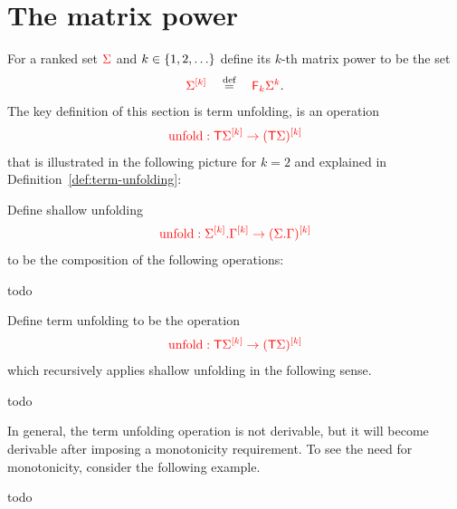 \section{The matrix power}

\newcommand{\mati}[2]{#2^{\ranked{[#1]}}}
\newcommand{\branches}{\mathsf{B}}

For a ranked set ${\color{red}{\Sigma}}$ and $k \in \{1,2,\ldots\}$ define its $k$-th matrix power 
to be the set
\begin{align*}
    \mati k \rSigma \quad \eqdef \quad \ranked{\reduce k \rSigma^k}.
\end{align*}
The key definition of this section is term unfolding, is an operation 
\begin{align*}
    \ranked{\unfold : \tmonad \mati k \rSigma \to \mati k {(\tmonad \Sigma)} }
    \end{align*}
that is illustrated in the  following picture for  $k=2$  and explained in Definition~\ref{def:term-unfolding}:
\begin{definition}\label{def:term-unfolding}
    Define shallow unfolding 
        \begin{align*}
        \ranked{\unfold : \shallowterm{\mati k \Sigma}{\mati k \Gamma} \to \mati k {(\shallowterm \Sigma \Gamma)}}
        \end{align*}        
to be the composition of the following operations:
\begin{center}
    todo
\end{center}
Define term unfolding to be the operation
\begin{align*}
    \ranked{\unfold : \tmonad \mati k \rSigma \to \mati k {(\tmonad \Sigma)} }
    \end{align*}
which recursively applies shallow unfolding in the following sense.
\begin{center}
    todo
\end{center}
\end{definition}

In general, the term unfolding operation is not derivable, but it will become derivable after imposing a monotonicity requirement.   To see the need for monotonicity, consider the following example.
\begin{example}
    todo
\end{example}

